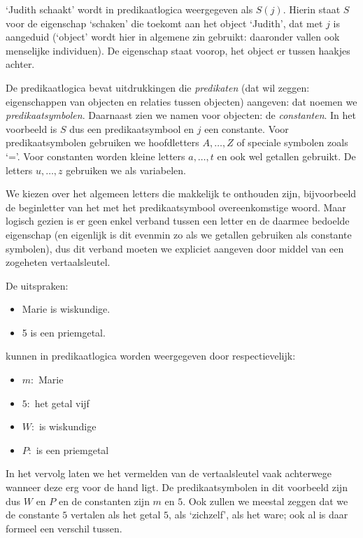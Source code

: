 \begin{example}\label{vb:pred:1}
`Judith schaakt' wordt in predikaatlogica weergegeven als $S(j)$. Hierin staat $S$ voor de eigenschap `schaken' die toekomt aan het object `Judith', dat met $j$ is aangeduid (`object' wordt hier in algemene zin gebruikt: daaronder vallen ook menselijke individuen). De eigenschap staat voorop, het object er tussen haakjes achter.
\end{example}

De predikaatlogica bevat uitdrukkingen die \textit{predikaten} (dat wil zeggen: eigenschappen van objecten en relaties tussen objecten) aangeven: dat noemen we \textit{predikaatsymbolen}. Daarnaast zien we namen voor objecten: de \textit{constanten}. In het voorbeeld is $S$ dus een predikaatsymbool en $j$ een constante. Voor predikaatsymbolen gebruiken we hoofdletters $A,\ldots,Z$ of speciale symbolen zoals `='. Voor constanten worden kleine letters $a,\ldots, t$ en ook wel getallen gebruikt. De letters $u,\ldots,z$ gebruiken we als variabelen.

We kiezen over het algemeen letters die makkelijk te onthouden zijn, bijvoorbeeld de beginletter van het met het predikaatsymbool overeenkomstige woord. Maar logisch gezien is er geen enkel verband tussen een letter en de daarmee bedoelde eigenschap (en eigenlijk is dit evenmin zo als we getallen gebruiken als constante symbolen), dus dit verband moeten we expliciet aangeven door middel van een zogeheten vertaalsleutel.

\begin{example}\label{vb:pred:2}
De uitspraken:
\begin{itemize}
    \item Marie is wiskundige.
    \item 5 is een priemgetal.
\end{itemize}
kunnen in predikaatlogica worden weergegeven door respectievelijk:
\begin{itemize}
    \item $m:$ Marie
    \item $5:$ het getal vijf
    \item $W:$ is wiskundige
    \item $P:$ is een priemgetal
\end{itemize}
In het vervolg laten we het vermelden van de vertaalsleutel vaak achterwege wanneer deze erg voor de hand ligt. De predikaatsymbolen in dit voorbeeld zijn dus $W$ en $P$ en de constanten zijn $m$ en $5$. Ook zullen we meestal zeggen dat we de constante $5$ vertalen als het getal $5$, als `zichzelf', als het ware; ook al is daar formeel een verschil tussen.
\end{example}

